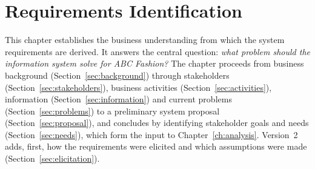 \documentclass[11pt,a4paper,oneside]{extreport}
\newif\ifshowvtwo
\newcommand{\upd}[1]{\ifshowvtwo\textcolor{red}{#1}\else#1\fi}
\begin{document}
\chapter{Requirements Identification}
\label{ch:identification}

This chapter establishes the business understanding from which the system requirements are derived. It answers the central question: \emph{what problem should the information system solve for ABC Fashion?} The chapter proceeds from business background (Section~\ref{sec:background}) through stakeholders (Section~\ref{sec:stakeholders}), business activities (Section~\ref{sec:activities}), information (Section~\ref{sec:information}) and current problems (Section~\ref{sec:problems}) to a preliminary system proposal (Section~\ref{sec:proposal}), and concludes by identifying stakeholder goals and needs (Section~\ref{sec:needs}), which form the input to Chapter~\ref{ch:analysis}. \upd{Version~2 adds, first, how the requirements were elicited and which assumptions were made (Section~\ref{sec:elicitation}).}

\end{document}
